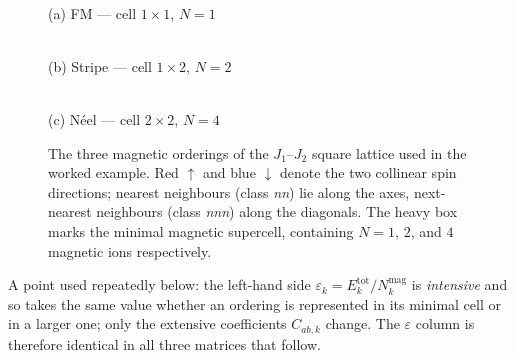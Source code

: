 \documentclass[11pt]{article}
\begin{document}
\begin{figure}[h]
\centering
\begin{minipage}[t]{0.31\textwidth}\centering
{}\\[3pt]
{\footnotesize (a) FM --- cell $1\times1$, $N=1$}
\end{minipage}
\hfill
\begin{minipage}[t]{0.31\textwidth}\centering
{}\\[3pt]
{\footnotesize (b) Stripe --- cell $1\times2$, $N=2$}
\end{minipage}
\hfill
\begin{minipage}[t]{0.31\textwidth}\centering
{}\\[3pt]
{\footnotesize (c) N\'eel --- cell $2\times2$, $N=4$}
\end{minipage}
\caption{The three magnetic orderings of the $J_1$--$J_2$ square lattice used in
the worked example. Red $\uparrow$ and blue $\downarrow$ denote the two collinear
spin directions; nearest neighbours (class \emph{nn}) lie along the axes,
next-nearest neighbours (class \emph{nnn}) along the diagonals. The heavy box
marks the minimal magnetic supercell, containing $N=1$, $2$, and $4$ magnetic
ions respectively.}
\label{fig:orderings}
\end{figure}

A point used repeatedly below: the left-hand side
$\varepsilon_k=E_k^{\mathrm{tot}}/N_k^{\mathrm{mag}}$ is \emph{intensive} and so
takes the same value whether an ordering is represented in its minimal cell or in
a larger one; only the extensive coefficients $C_{ab,k}$ change. The
$\varepsilon$ column is therefore identical in all three matrices that follow.
\end{document}
